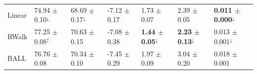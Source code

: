 \begin{tabular}{lllllll}
Linear & \small 74.94 $\pm$ 0.10$^{\downarrow}$ & \small 68.69 $\pm$ 0.17$^{\downarrow}$ & \small -7.12 $\pm$ 0.17 & \small 1.73 $\pm$ 0.07 & \small 2.39 $\pm$ 0.05 & \small \textbf{0.011 $\pm$ 0.000}$^{\downarrow}$ \\
RWalk & \small 77.25 $\pm$ 0.08$^{\uparrow}$ & \small 70.63 $\pm$ 0.15 & \small -7.08 $\pm$ 0.38 & \small \textbf{1.44 $\pm$ 0.05}$^{\downarrow}$ & \small \textbf{2.23 $\pm$ 0.13}$^{\downarrow}$ & \small 0.013 $\pm$ 0.001$^{\downarrow}$ \\
BALL & \small 76.76 $\pm$ 0.08 & \small 70.34 $\pm$ 0.10 & \small -7.45 $\pm$ 0.29 & \small 1.97 $\pm$ 0.09 & \small 3.04 $\pm$ 0.20 & \small 0.018 $\pm$ 0.001 \\
\bottomrule
\end{tabular}
